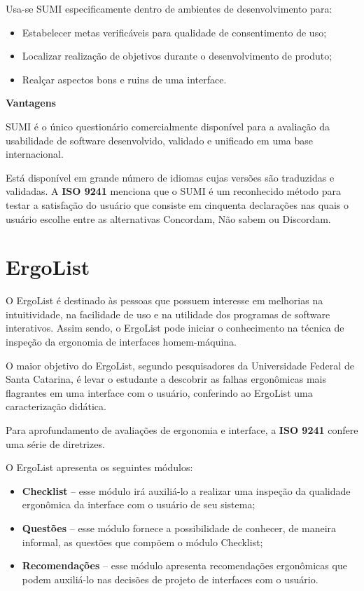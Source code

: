 		Usa-se SUMI especificamente dentro de ambientes de desenvolvimento para:

		\begin{itemize}
			\item{Estabelecer metas verificáveis para qualidade de consentimento de uso;}
			\item{Localizar realização de objetivos durante o desenvolvimento de produto;}
			\item{Realçar aspectos bons e ruins de uma interface.}
		\end{itemize}

		\textbf{Vantagens}

		SUMI é o único questionário comercialmente disponível para a avaliação da usabilidade de software desenvolvido, validado e unificado em uma base internacional. 

		Está disponível em grande número de idiomas cujas versões são traduzidas e validadas. A \textbf{ISO 9241} menciona que o SUMI é um reconhecido método para testar a satisfação do usuário que consiste em cinquenta declarações nas quais o usuário escolhe entre as alternativas Concordam, Não sabem ou Discordam. 

	\section[ErgoList]{ErgoList}
	\label{sec:questionarios_ErgoList}
		O ErgoList é destinado às pessoas que possuem interesse em melhorias na intuitividade, na facilidade de uso e na utilidade dos programas de software interativos. Assim sendo, o ErgoList pode iniciar o conhecimento na técnica de inspeção da ergonomia de interfaces homem-máquina.
		
		O maior objetivo do ErgoList, segundo pesquisadores da Universidade Federal de Santa Catarina, é levar o estudante a descobrir as falhas ergonômicas mais flagrantes em uma interface com o usuário, conferindo ao ErgoList uma caracterização didática.
		
		Para aprofundamento de avaliações de ergonomia e interface, a \textbf{ISO 9241} confere uma série de diretrizes.

		O ErgoList apresenta os seguintes módulos: 

		\begin{itemize}
			\item{\textbf{Checklist} – esse módulo irá auxiliá-lo a realizar uma inspeção da qualidade ergonômica da interface com o usuário de seu sistema;}
			\item{\textbf{Questões} – esse módulo fornece a possibilidade de conhecer, de maneira informal, as questões que compõem o módulo Checklist;}
			\item{\textbf{Recomendações} – esse módulo apresenta recomendações ergonômicas que podem auxiliá-lo nas decisões de projeto de interfaces com o usuário.}
		\end{itemize}

